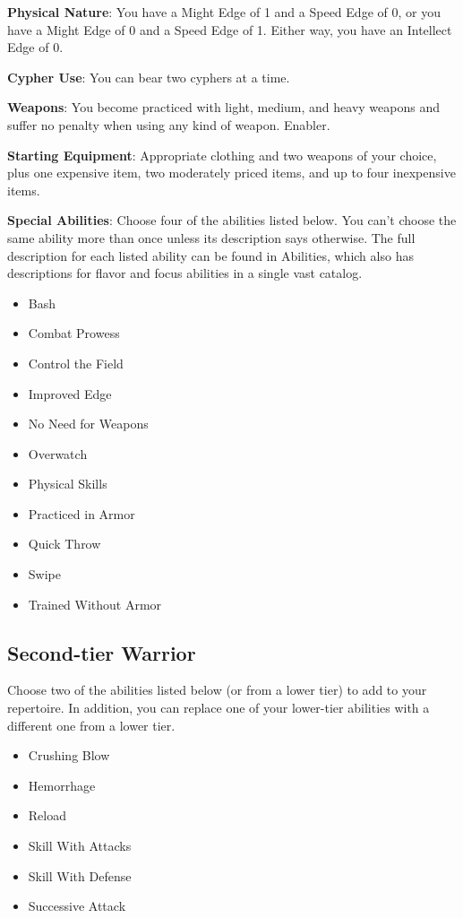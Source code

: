\begin{multicols}{2}
\textbf{Physical Nature}: You have a Might Edge of 1 and a Speed Edge of 0, or you have a Might Edge of 0 and a Speed Edge of 1. Either way, you have an Intellect Edge of 0.

\textbf{Cypher Use}: You can bear two cyphers at a time.

\textbf{Weapons}: You become practiced with light, medium, and heavy weapons and suffer no penalty when using any kind of weapon. Enabler.

\textbf{Starting Equipment}: Appropriate clothing and two weapons of your choice, plus one expensive item, two moderately priced items, and up to four inexpensive items.

\textbf{Special Abilities}: Choose four of the abilities listed below. You can’t choose the same ability more than once unless its description says otherwise. The full description for each listed ability can be found in Abilities, which also has descriptions for flavor and focus abilities in a single vast catalog.

\begin{itemize}
\item Bash
\item Combat Prowess
\item Control the Field
\item Improved Edge
\item No Need for Weapons
\item Overwatch
\item Physical Skills
\item Practiced in Armor
\item Quick Throw
\item Swipe
\item Trained Without Armor
\end{itemize}

\subsection{Second-tier Warrior}

Choose two of the abilities listed below (or from a lower tier) to add to your repertoire. In addition, you can replace one of your lower-tier abilities with a different one from a lower tier.

\begin{itemize}
\item Crushing Blow
\item Hemorrhage
\item Reload
\item Skill With Attacks
\item Skill With Defense
\item Successive Attack
\end{itemize}



\end{multicols}
